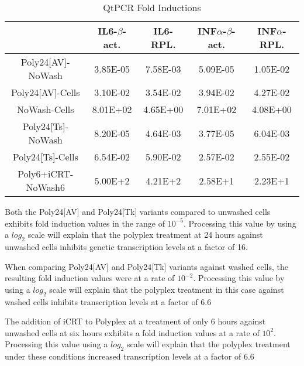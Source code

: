 \documentclass[journal, a4paper]{IEEEtran}
\begin{document}
    \begin{table}[!hbt]
      \begin{center}
      \caption{QtPCR Fold Inductions}
      \label{tab:simParameters}
      \begin{tabular}{|c|c|c|c|c|}
        \hline
        & IL6-$\beta$-act. & IL6-RPL. & INF$\alpha$-$\beta$-act. & INF$\alpha$-RPL. \\
        \hline
        Poly24[AV]-NoWash & 3.85E-05 & 7.58E-03 & 5.09E-05 & 1.05E-02 \\
        \hline
        Poly24[AV]-Cells & 3.10E-02 & 3.54E-02 & 3.94E-02 & 4.27E-02 \\
        \hline
        NoWash-Cells & 8.01E+02 & 4.65E+00 & 7.01E+02 & 4.08E+00 \\
        \hline
        Poly24[Ts]-NoWash & 8.20E-05 & 4.64E-03 & 3.77E-05 & 6.04E-03\\
        \hline
        Poly24[Ts]-Cells & 6.54E-02 & 5.90E-02 & 2.57E-02 & 2.55E-02\\
        \hline
        Poly6+iCRT-NoWash6 & 5.00E+2 & 4.21E+2 & 2.58E+1 & 2.23E+1 \\
        \hline
      \end{tabular}
      \end{center}
    \end{table}


    Both the Poly24[AV] and Poly24[Tk] variants compared to unwashed cells
    exhibits fold induction values in the range of $10^{-5}$.
    Processing this value by using a $log_2$ scale will explain that the polyplex treatment at 24 hours
    against unwashed cells inhibits genetic transcription levels at a factor of 16.

    When comparing Poly24[AV] and Poly24[Tk] variants against washed cells,
    the resulting fold induction values were at a rate of $10^{-2}$. Processing this value
    by using a $log_2$ scale will explain that the polyplex treatment
    in this case against washed cells inhibits transcription levels at a factor of 6.6

    The addition of iCRT to Polyplex at a treatment of only 6 hours against unwashed
    cells at six hours exhibits a fold induction values at a rate of $10^2$. Processing
    this value using a $log_2$ scale will explain that the polyplex treatment under these
    conditions increased transcription levels at a factor of 6.6
\end{document}
